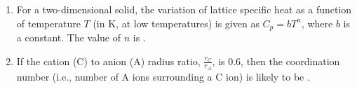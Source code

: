 \documentclass[journal,12pt,onecolumn]{IEEEtran}
\theoremstyle{remark}
\begin{document}
\begin{enumerate}
    \begin{figure}[H]
        \centering
          
    \end{figure}
    \begin{multicols}{4}
    \begin{enumerate}
        \item 0.250
        \item 0.333
        \item 0.375
        \item 0.500
    \end{enumerate}
    \end{multicols}
    \item For a two-dimensional solid, the variation of lattice specific heat as a function of temperature $T$ (in K, at low temperatures) is given as $C_p = bT^n$, where $b$ is a constant. The value of $n$ is {\underline{\hspace{2cm}}}.
    \item If the cation (C) to anion (A) radius ratio, $\frac{r_C}{r_A}$, is 0.6, then the coordination number (i.e., number of A ions surrounding a C ion) is likely to be {\underline{\hspace{2cm}}}.
\end{enumerate}
\end{document}
